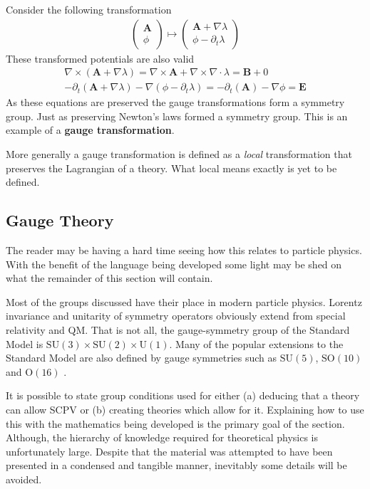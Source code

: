 Consider the following transformation
\begin{align*}
\left( \begin{array}{l}
\mathbf{A} \\ \phi
\end{array} \right) \mapsto
\left( \begin{array}{l}
\mathbf{A}+\nabla \lambda \\
\phi - \partial_t \lambda
\end{array} \right)
\end{align*}
These transformed potentials are also valid
\begin{align*}
\nabla \times (\mathbf{A}+\nabla \lambda) = \nabla\times \mathbf{A} + \nabla \times \nabla \cdot \lambda = \mathbf{B} + 0 \\
-\partial_t(\mathbf{A}+\nabla \lambda)-\nabla (\phi - \partial_t \lambda) = -\partial_t(\mathbf{A})-\nabla \phi = \mathbf{E}
\end{align*}
As these equations are preserved the gauge transformations form a symmetry group. Just as preserving Newton's laws formed a symmetry group. This is an example of a \textbf{gauge transformation}.

More generally a gauge transformation is defined as a \textit{local} transformation that preserves the Lagrangian of a theory. What local means exactly is yet to be defined.

\subsection{Gauge Theory}

The reader may be having a hard time seeing how this relates to particle physics. With the benefit of the language being developed some light may be shed on what the remainder of this section will contain.

Most of the groups discussed have their place in modern particle physics. Lorentz invariance and unitarity of symmetry operators obviously extend from special relativity and QM. That is not all, the gauge-symmetry group of the Standard Model is $\mathrm{SU}(3)\times \mathrm{SU}(2)\times \mathrm{U}(1)$. Many of the popular extensions to the Standard Model are also defined by gauge symmetries such as $\mathrm{SU}(5)$, $\mathrm{SO}(10)$ and $\mathrm{O}(16)$ \cite{SCPV4}.

It is possible to state group conditions used for either (a) deducing that a theory can allow SCPV or (b) creating theories which allow for it\cite{SCPV5}. Explaining how to use this with the mathematics being developed is the primary goal of the section. Although, the hierarchy of knowledge required for theoretical physics is unfortunately large. Despite that the material was attempted to have been presented in a condensed and tangible manner, inevitably some details will be avoided.

